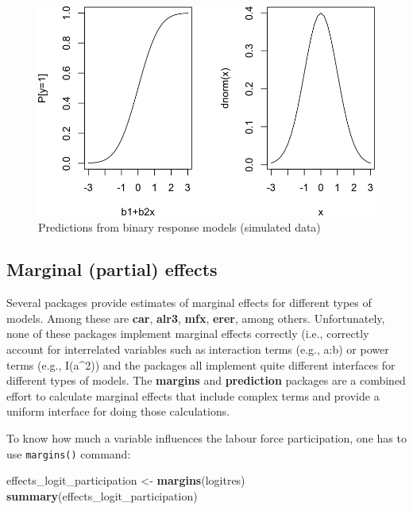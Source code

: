 \documentclass[]{book}
\newenvironment{Shaded}{\begin{snugshade}}{\end{snugshade}}
\newcommand{\KeywordTok}[1]{\textcolor[rgb]{0.13,0.29,0.53}{\textbf{#1}}}
\newcommand{\NormalTok}[1]{#1}
\newcommand{\StringTok}[1]{\textcolor[rgb]{0.31,0.60,0.02}{#1}}
\begin{document}
\begin{figure}

{\centering \includegraphics[width=0.8\linewidth]{MEM5220_R_files/figure-latex/fig21-1} 

}

\caption{Predictions from binary response models (simulated data)}\label{fig:fig21}
\end{figure}

\hypertarget{marginal-partial-effects}{%
\subsection{Marginal (partial) effects}\label{marginal-partial-effects}}

Several packages provide estimates of marginal effects for different
types of models. Among these are \textbf{car}, \textbf{alr3},
\textbf{mfx}, \textbf{erer}, among others. Unfortunately, none of these
packages implement marginal effects correctly (i.e., correctly account
for interrelated variables such as interaction terms (e.g., a:b) or
power terms (e.g., I(a\^{}2)) and the packages all implement quite
different interfaces for different types of models. The \textbf{margins}
and \textbf{prediction} packages are a combined effort to calculate
marginal effects that include complex terms and provide a uniform
interface for doing those calculations.

To know how much a variable influences the labour force participation,
one has to use \texttt{margins()} command:

\begin{Shaded}
\begin{Highlighting}[]
\NormalTok{effects_logit_participation <-}\StringTok{ }\KeywordTok{margins}\NormalTok{(logitres) }
\KeywordTok{summary}\NormalTok{(effects_logit_participation)}
\end{Highlighting}
\end{Shaded}
\end{document}
